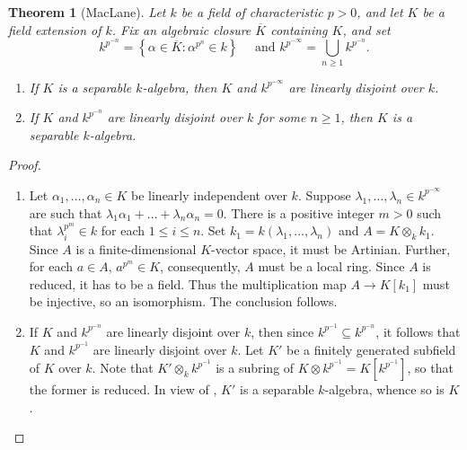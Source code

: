 \documentclass[10pt]{article}
\theoremstyle{thmstyle}
\newtheorem{theorem}{Theorem}[section]
\theoremstyle{defstyle}
\renewcommand{\le}{\leqslant}
\renewcommand{\ge}{\geqslant}
\begin{document}
\begin{theorem}[MacLane]
    Let $k$ be a field of characteristic $p > 0$, and let $K$ be a field extension of $k$. Fix an algebraic closure $\overline K$ containing $K$, and set 
    \begin{equation*}
        k^{p^{-n}} = \left\{\alpha\in\overline K\colon \alpha^{p^n}\in k\right\}\quad\text{ and } k^{p^{-\infty}} = \bigcup_{n\ge 1} k^{p^{-n}}.
    \end{equation*}
    \begin{enumerate}[label=(\arabic*)]
        \item If $K$ is a separable $k$-algebra, then $K$ and $k^{p^{-\infty}}$ are linearly disjoint over $k$. 
        \item If $K$ and $k^{p^{-n}}$ are linearly disjoint over $k$ for some $n\ge 1$, then $K$ is a separable $k$-algebra.
    \end{enumerate}
\end{theorem}
\begin{proof}
\begin{enumerate}[label=(\arabic*)]
    \item Let $\alpha_1,\dots,\alpha_n\in K$ be linearly independent over $k$. Suppose $\lambda_1,\dots,\lambda_n\in k^{p^{-\infty}}$ are such that $\lambda_1\alpha_1 + \dots + \lambda_n\alpha_n = 0$. There is a positive integer $m > 0$ such that $\lambda_i^{p^m}\in k$ for each $1\le i\le n$. Set $k_1 = k(\lambda_1,\dots,\lambda_n)$ and $A = K\otimes_k k_1$. Since $A$ is a finite-dimensional $K$-vector space, it must be Artinian. Further, for each $a\in A$, $a^{p^m}\in K$, consequently, $A$ must be a local ring. Since $A$ is reduced, it has to be a field. Thus the multiplication map $A\to K[k_1]$ must be injective, so an isomorphism. The conclusion follows. 
    \item If $K$ and $k^{p^{-n}}$ are linearly disjoint over $k$, then since $k^{p^{-1}}\subseteq k^{p^{-n}}$, it follows that $K$ and $k^{p^{-1}}$ are linearly disjoint over $k$. Let $K'$ be a finitely generated subfield of $K$ over $k$. Note that $K'\otimes_k k^{p^{-1}}$ is a subring of $K\otimes k^{p^{-1}} = K[k^{p^{-1}}]$, so that the former is reduced. In view of , $K'$ is a separable $k$-algebra, whence so is $K$. \qedhere
\end{enumerate}
\end{proof}
\end{document}
